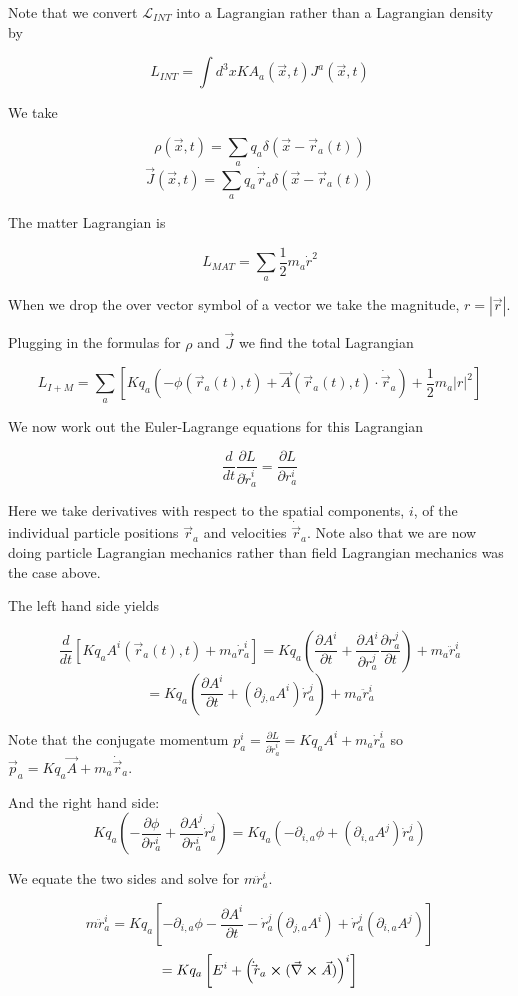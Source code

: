 \documentclass[12pt]{article}
\newcommand{\pardiv}[2][]{\frac{\partial #1}{\partial #2}}
\newcommand{\vecnab}{\vec{\nabla}}
\begin{document}
Note that we convert $\mathcal{L}_{INT}$ into a Lagrangian rather than a Lagrangian density by 

\[L_{INT} = \int d^3 x KA_{a}(\vec{x},t)J^{a}(\vec{x},t) \]

We take

\[ \rho(\vec{x},t) = \sum_{a} q_{a} \delta(\vec{x} - \vec{r}_{a}(t))\]
\[ \vec{J}(\vec{x},t) = \sum_{a} q_{a} \dot{\vec{r}}_{a}\delta(\vec{x}-\vec{r}_{a}(t)) \]

The matter Lagrangian is

\[L_{MAT} = \sum_{a} \frac{1}{2} m_{a} \dot{r}^2 \]

When we drop the over vector symbol of a vector we take the magnitude, $r = |\vec{r}|$.

Plugging in the formulas for $\rho$ and $\vec{J}$ we find the total Lagrangian

\[ L_{I+M} = \sum_{a}\left[ K q_{a} \left(-\phi(\vec{r}_{a}(t),t) + \vec{A}(\vec{r}_{a}(t),t) \cdot \dot{\vec{r}}_{a}\right) + \frac{1}{2} m_{a} |r|^2 \right]\]

We now work out the Euler-Lagrange equations for this Lagrangian

\[\frac{d}{dt} \pardiv[L]{\dot{r}_{a}^i} = \pardiv[L]{r_{a}^i} \]

Here we take derivatives with respect to the spatial components, $i$, of the individual particle positions $\vec{r}_{a}$ and velocities $\dot{\vec{r}}_{a}$.
Note also that we are now doing particle Lagrangian mechanics rather than field Lagrangian mechanics was the case above.

The left hand side yields

\[\frac{d}{dt}\left[K q_{a} A^i(\vec{r}_{a}(t),t) +m_{a}\dot{r}_{a}^i\right] = K q_{a} \left(\pardiv[A^i]{t} + \pardiv[A^i]{r_a^j} \pardiv[r_a^j]{t}\right) + m_a \ddot{r}_a^i \]
\[ = K q_a \left( \pardiv[A^i]{t} + (\partial_{j,a} A^i) \dot{r}_a^j\right) + m_a \ddot{r}_a^i \]

Note that the conjugate momentum $p_a^i = \pardiv[L]{\dot{r}_a^i} = Kq_a A^i + m_a \dot{r}_a^i$ so $\vec{p}_a = Kq_a \vec{A} +m_a \dot{\vec{r}}_a$.

And the right hand side:
\[Kq_a \left(- \pardiv[\phi]{r_a^i} + \pardiv[A^j]{r_a^i} \dot{r}_a^j \right) = Kq_a\left(-\partial_{i,a} \phi +(\partial_{i,a}A^j)\dot{r}_a^j\right)\]

We equate the two sides and solve for $m \ddot{r}_a^i$.

\[m\ddot{r}_a^i = Kq_a \left[ -\partial_{i,a} \phi -\pardiv[A^i]{t} - \dot{r}_a^j(\partial_{j,a}A^i) +\dot{r}_a^j (\partial_{i,a} A^j) \right]    \]
\[ = K q_a \left[ E^i + \left(\dot\vec{{r}}_a \cross(\vecnab \cross \vec{A})\right)^i \right] \]
\end{document}
